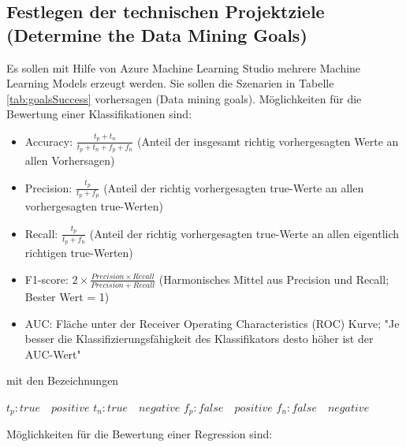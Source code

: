 \subsection{Festlegen der technischen Projektziele (Determine the Data Mining Goals)}\label{subsec:goals}
Es sollen mit Hilfe von Azure Machine Learning Studio mehrere Machine Learning Models erzeugt werden. Sie sollen die Szenarien in Tabelle \ref{tab:goalsSuccess} vorhersagen (Data mining goals).\newline
Möglichkeiten für die Bewertung einer Klassifikationen sind:
\begin{itemize}
\item Accuracy: $ \frac{t_{p} + t_{n}}{t_{p} + t_{n} + f_{p} + f_{n}}$ (Anteil der insgesamt richtig vorhergesagten Werte an allen Vorhersagen)
\item Precision: $ \frac{t_{p}}{t_{p} + f_{p}}$ (Anteil der richtig vorhergesagten true-Werte an allen vorhergesagten true-Werten)
\item Recall: $ \frac{t_{p}}{t_{p} + f_{n}}$ (Anteil der richtig vorhergesagten true-Werte an allen eigentlich richtigen true-Werten)
\item F1-score: $ 2 \times \frac{Precision \times Recall}{Precision + Recall}$ (Harmonisches Mittel aus Precision und Recall; Bester Wert = 1)
\item AUC: Fläche unter der Receiver Operating Characteristics (ROC) Kurve; "Je besser die Klassifizierungsfähigkeit des Klassifikators desto höher ist der AUC-Wert"\citep[ROC-Kurve]{lohninger_grundlagen_2013} 
\end{itemize} 
mit den Bezeichnungen \newline
\begin{framed}
$ t_{p} : true \quad positive $ \newline
$ t_{n} : true \quad negative $ \newline
$ f_{p} : false \quad positive $ \newline
$ f_{n} : false \quad negative $
\end{framed}
Möglichkeiten für die Bewertung einer Regression sind:
